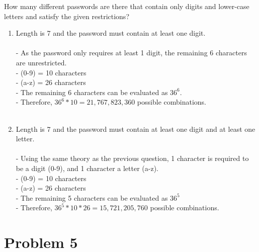 \documentclass{amsart}
\theoremstyle{definition}
\theoremstyle{Exercise}
\theoremstyle{remark}
\theoremstyle{rule}
\numberwithin{equation}{section}
\begin{document}
How many different passwords are there that contain only digits and lower-case letters and satisfy the given restrictions?\\
      \begin{enumerate}[label=(\roman*), start=3]
    \item Length is 7 and the password must contain at least one digit.\\\\
  - As the password only requires at least 1 digit, the remaining 6 characters are unrestricted.\\
  - (0-9) = 10 characters\\
  - (a-z) = 26 characters\\
  - The remaining 6 characters can be evaluated as $36^6$.\\
  - Therefore, $36^6*10 = 21,767,823,360$ possible combinations.
\\\\
     \item Length is 7 and the password must contain at least one digit and at least one letter.\\\\
  - Using the same theory as the previous question, 1 character is required to be a digit (0-9), and 1 character a letter (a-z).\\
  - (0-9) = 10 characters\\
  - (a-z) = 26 characters\\
  - The remaining 5 characters can be evaluated as $36^5$\\
  - Therefore, $36^5*10*26 = 15,721,205,760$ possible combinations.\\
    \end{enumerate}
 
 \newpage
\vspace*{0.1in}
\section*{Problem 5}
\end{document}
